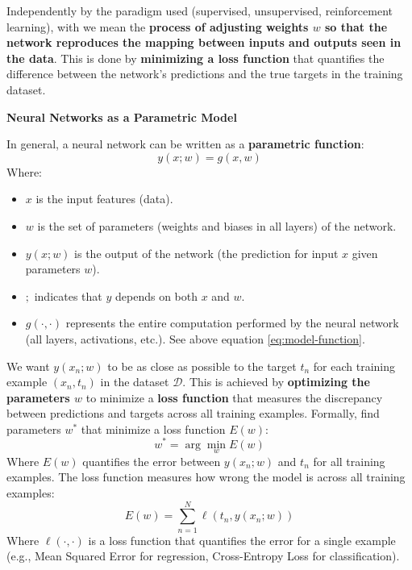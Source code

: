 \highspace
Independently by the paradigm used (supervised, unsupervised, reinforcement learning), with  we mean the \textbf{process of adjusting weights $w$ so that the network reproduces the mapping between inputs and outputs seen in the data}. This is done by \textbf{minimizing a loss function} that quantifies the difference between the network's predictions and the true targets in the training dataset.

\highspace
\begin{flushleft}
    \textcolor{Green3}{ \textbf{Neural Networks as a Parametric Model}}
\end{flushleft}
In general, a neural network can be written as a \textbf{parametric function}:
\begin{equation}
    y\left(x; w\right) = g\left(x, w\right)
\end{equation}
Where:
\begin{itemize}
    \item $x$ is the input features (data).
    \item $w$ is the set of parameters (weights and biases in all layers) of the network.
    \item $y\left(x; w\right)$ is the output of the network (the prediction for input $x$ given parameters $w$).
    \item $;$ indicates that $y$ depends on both $x$ and $w$.
    \item $g(\cdot, \cdot)$ represents the entire computation performed by the neural network (all layers, activations, etc.). See above equation \ref{eq:model-function}.
\end{itemize}
We want $y\left(x_{n}; w\right)$ to be as close as possible to the target $t_{n}$ for each training example $\left(x_{n}, t_{n}\right)$ in the dataset $\mathcal{D}$. This is achieved by \textbf{optimizing the parameters $w$} to minimize a \textbf{loss function} that measures the discrepancy between predictions and targets across all training examples. Formally, find parameters $w^{*}$ that minimize a loss function $E(w)$:
\begin{equation}\label{eq:optimal-weights}
    w^{*} = \arg\min_{w} E\left(w\right)
\end{equation}
Where $E(w)$ quantifies the error between $y\left(x_{n}; w\right)$ and $t_{n}$ for all training examples. The loss function measures how wrong the model is across all training examples:
\begin{equation}
    E\left(w\right) = \displaystyle\sum_{n=1}^{N} \ell\left(t_{n}, y\left(x_{n}; w\right)\right)
\end{equation}
Where $\ell(\cdot, \cdot)$ is a loss function that quantifies the error for a single example (e.g., Mean Squared Error for regression, Cross-Entropy Loss for classification).


